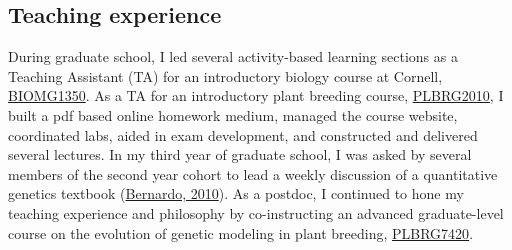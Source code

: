\documentclass[11pt]{article}
\begin{document}


\subsection*{Teaching experience}

During graduate school, I led several activity-based learning sections as a Teaching Assistant (TA) for an introductory biology course at Cornell, \href{https://classes.cornell.edu/browse/roster/SP19/class/BIOMG/1350}{BIOMG1350}. As a TA for an introductory plant breeding course, \href{https://classes.cornell.edu/browse/roster/FA17/class/PLBRG/2010}{PLBRG2010}, I built a pdf based online homework medium, managed the course website, coordinated labs, aided in exam development, and constructed and delivered several lectures. In my third year of graduate school, I was asked by several members of the second year cohort to lead a weekly discussion of a quantitative genetics textbook (\href{http://stemmapress.com/}{Bernardo, 2010}). As a postdoc, I continued to hone my teaching experience and philosophy by co-instructing an advanced graduate-level course on the evolution of genetic modeling in plant breeding, \href{https://classes.cornell.edu/browse/roster/FA19/class/PLBRG/7420}{PLBRG7420}.
\end{document}
